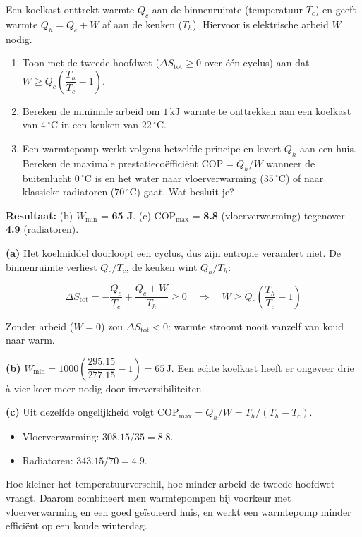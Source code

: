 \begin{oefening}
Een koelkast onttrekt warmte \(Q_c\) aan de binnenruimte (temperatuur \(T_c\)) en geeft warmte \(Q_h = Q_c + W\) af aan de keuken (\(T_h\)). Hiervoor is elektrische arbeid \(W\) nodig.

\begin{enumerate}
\item[(a)]
  Toon met de tweede hoofdwet (\(\Delta S_{\text{tot}} \geq 0\) over één cyclus) aan dat \(W \geq Q_c\left(\dfrac{T_h}{T_c} - 1\right)\).
\item[(b)]
  Bereken de minimale arbeid om \(1\,\mathrm{kJ}\) warmte te onttrekken aan een koelkast van \(4\,^\circ\mathrm{C}\) in een keuken van \(22\,^\circ\mathrm{C}\).
\item[(c)]
  Een warmtepomp werkt volgens hetzelfde principe en levert \(Q_h\) aan een huis. Bereken de maximale prestatiecoëfficiënt \(\mathrm{COP} = Q_h/W\) wanneer de buitenlucht \(0\,^\circ\mathrm{C}\) is en het water naar vloerverwarming (\(35\,^\circ\mathrm{C}\)) of naar klassieke radiatoren (\(70\,^\circ\mathrm{C}\)) gaat. Wat besluit je?
\end{enumerate}
\end{oefening}
\begin{oplossing}
\textbf{Resultaat:} (b) \(W_{\min}\) = \textbf{65 J}. (c) \(\mathrm{COP}_{\max}\) = \textbf{8.8} (vloerverwarming) tegenover \textbf{4.9} (radiatoren).

\textbf{(a)} Het koelmiddel doorloopt een cyclus, dus zijn entropie verandert niet. De binnenruimte verliest \(Q_c/T_c\), de keuken wint \(Q_h/T_h\):

\[
\Delta S_{\text{tot}} = -\frac{Q_c}{T_c} + \frac{Q_c + W}{T_h} \geq 0 \quad\Rightarrow\quad W \geq Q_c\left(\frac{T_h}{T_c} - 1\right)
\]

Zonder arbeid (\(W = 0\)) zou \(\Delta S_{\text{tot}} < 0\): warmte stroomt nooit vanzelf van koud naar warm.

\textbf{(b)} \(W_{\min} = 1000\left(\dfrac{295.15}{277.15} - 1\right) = 65\,\mathrm{J}\). Een echte koelkast heeft er ongeveer drie à vier keer meer nodig door irreversibiliteiten.

\textbf{(c)} Uit dezelfde ongelijkheid volgt \(\mathrm{COP}_{\max} = Q_h/W = T_h/(T_h - T_c)\).

\begin{itemize}
\item
  Vloerverwarming: \(308.15/35 = 8.8\).
\item
  Radiatoren: \(343.15/70 = 4.9\).
\end{itemize}

Hoe kleiner het temperatuurverschil, hoe minder arbeid de tweede hoofdwet vraagt. Daarom combineert men warmtepompen bij voorkeur met vloerverwarming en een goed geïsoleerd huis, en werkt een warmtepomp minder efficiënt op een koude winterdag.
\end{oplossing}

